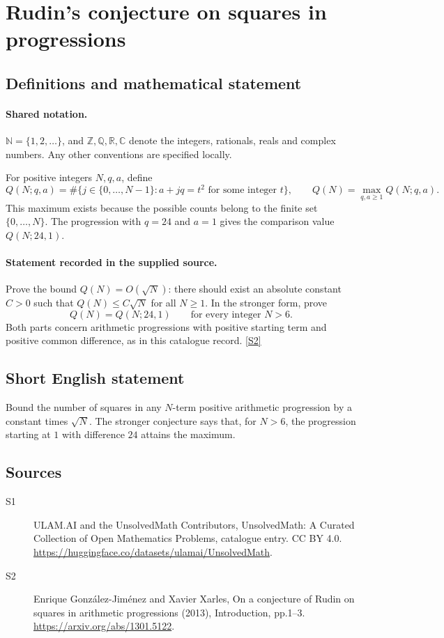 \documentclass[11pt]{article}
\newcommand{\sref}[2]{\hyperlink{source:#1:#2}{[S#2]}}
\begin{document}
\section{Rudin's conjecture on squares in progressions}\label{statement}

\subsection{Definitions and mathematical statement}

\paragraph{Shared notation.}$\mathbb N=\{1,2,\ldots\}$, and $\mathbb Z,\mathbb Q,\mathbb R,\mathbb C$ denote the integers, rationals, reals and complex numbers. Any other conventions are specified locally.


For positive integers $N,q,a$, define
\[
Q(N;q,a)=\#\{j\in\{0,\ldots,N-1\}: a+jq=t^2\text{ for some integer }t\},
\qquad Q(N)=\max_{q,a\ge1}Q(N;q,a).
\]
This maximum exists because the possible counts belong to the finite set $\{0,\ldots,N\}$. The progression with $q=24$ and $a=1$ gives the comparison value $Q(N;24,1)$.
\paragraph{Statement recorded in the supplied source.}
Prove the bound $Q(N)=O(\sqrt N)$: there should exist an absolute constant $C>0$ such that $Q(N)\le C\sqrt N$ for all $N\ge1$. In the stronger form, prove
\[
Q(N)=Q(N;24,1)\qquad\text{for every integer }N>6.
\]
Both parts concern arithmetic progressions with positive starting term and positive common difference, as in this catalogue record. \sref{statement}{2}
\subsection{Short English statement}
Bound the number of squares in any $N$-term positive arithmetic progression by a constant times $\sqrt N$. The stronger conjecture says that, for $N>6$, the progression starting at $1$ with difference $24$ attains the maximum.
\subsection{Sources}
\begin{description}
\item[\hypertarget{source:statement:1}{S1}] ULAM.AI and the UnsolvedMath Contributors, UnsolvedMath: A Curated Collection of Open Mathematics Problems, catalogue entry. CC BY 4.0. \url{https://huggingface.co/datasets/ulamai/UnsolvedMath}.
\item[\hypertarget{source:statement:2}{S2}] Enrique González-Jiménez and Xavier Xarles, On a conjecture of Rudin on squares in arithmetic progressions (2013), Introduction, pp.1–3. \url{https://arxiv.org/abs/1301.5122}.
\end{description}
\label{end:statement}
\end{document}
